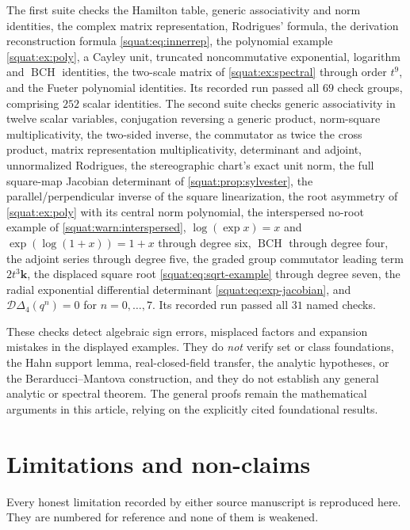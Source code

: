 \documentclass[11pt,letterpaper]{article}
\numberwithin{equation}{section}
\theoremstyle{definition}
\theoremstyle{remark}
\newcommand{\kk}{\mathbf k}
\newcommand{\BCH}{\operatorname{BCH}}
\newcommand{\DD}{\mathcal D}
\begin{document}
The first suite checks the Hamilton table, generic associativity and norm identities, the
complex matrix representation, Rodrigues' formula, the derivation reconstruction formula
\cref{squat:eq:innerrep}, the polynomial example \cref{squat:ex:poly}, a Cayley unit,
truncated noncommutative exponential, logarithm and $\BCH$ identities, the two-scale
matrix of \cref{squat:ex:spectral} through order $t^9$, and the Fueter polynomial
identities. Its recorded run passed all $69$ check groups, comprising $252$ scalar
identities. The second suite checks generic associativity in twelve scalar variables,
conjugation reversing a generic product, norm-square multiplicativity, the two-sided
inverse, the commutator as twice the cross product, matrix representation
multiplicativity, determinant and adjoint, unnormalized Rodrigues, the stereographic
chart's exact unit norm, the full square-map Jacobian determinant of
\cref{squat:prop:sylvester}, the parallel/perpendicular inverse of the square
linearization, the root asymmetry of \cref{squat:ex:poly} with its central norm polynomial,
the interspersed no-root example of \cref{squat:warn:interspersed}, $\log(\exp x)=x$ and
$\exp(\log(1+x))=1+x$ through degree six, $\BCH$ through degree four, the adjoint series
through degree five, the graded group commutator leading term $2t^3\kk$, the displaced
square root \cref{squat:eq:sqrt-example} through degree seven, the radial exponential
differential determinant \cref{squat:eq:exp-jacobian}, and
$\DD\Delta_4(q^n)=0$ for $n=0,\ldots,7$. Its recorded run passed all $31$ named checks.

These checks detect algebraic sign errors, misplaced factors and expansion mistakes in the
displayed examples. They do \emph{not} verify set or class foundations, the Hahn support
lemma, real-closed-field transfer, the analytic hypotheses, or the Berarducci--Mantova
construction, and they do not establish any general analytic or spectral theorem. The
general proofs remain the mathematical arguments in this article, relying on the explicitly
cited foundational results.

\section{Limitations and non-claims}\label{squat:sec:nonclaims}

Every honest limitation recorded by either source manuscript is reproduced here. They are
numbered for reference and none of them is weakened.
\end{document}
